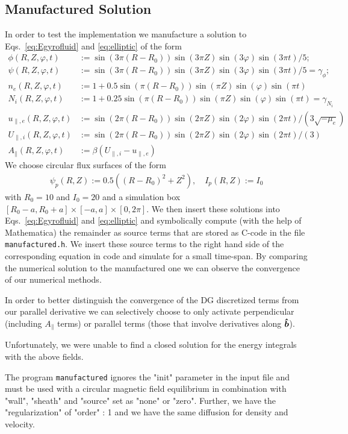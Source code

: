 \subsection{Manufactured Solution} \label{sec:manufactured}
In order to test the implementation we manufacture a solution to
Eqs.~\eqref{eq:Egyrofluid} and \eqref{eq:elliptic} of the form
\begin{align*}
\phi(R,Z,\varphi,t) &:= \sin(3\pi(R-R_0))\sin(3\pi Z)\sin(3\varphi)\sin(3\pi t)/5; \\
\psi(R,Z,\varphi,t) &:= \sin(3\pi(R-R_0))\sin(3\pi Z)\sin(3\varphi)\sin(3\pi t)/5 = \gamma_{\phi}; \\
n_e(R,Z,\varphi, t) &:= 1 + 0.5\sin(\pi(R-R_0))\sin(\pi Z)\sin(\varphi)\sin(\pi t) \\
{N_i}(R,Z,\varphi,t) &:= 1 + 0.25 \sin(\pi(R-R_0))\sin(\pi Z)\sin(\varphi)\sin(\pi t) = \gamma_{N_i} \\
u_{\parallel,e}(R,Z,\varphi, t) &:= \sin(2\pi(R-R_0))\sin(2\pi Z)\sin(2\varphi)\sin(2\pi t)/(3\sqrt{-\mu_e}) \\
U_{\parallel,i}(R,Z,\varphi, t) &:= \sin(2\pi(R-R_0))\sin(2\pi Z)\sin(2\varphi)\sin(2\pi t)/(3) \\
A_\parallel( R,Z,\varphi,t) &:= \beta( U_{\parallel,i} - u_{\parallel,e})
\end{align*}
We choose circular flux surfaces of the form
\begin{align*}
\psi_p(R,Z) :=0.5((R-R_0)^2 + Z^2),\quad
I_p(R,Z):=I_0
\end{align*}
with $R_0=10$ and $I_0=20$ and a simulation box
$[R_0-a,R_0+a]\times[-a,a]\times[0,2\pi]$.
We then insert these solutions into Eqs.~\eqref{eq:Egyrofluid} and
\eqref{eq:elliptic} and symbolically compute (with the help of Mathematica) the
remainder as source terms that are stored as C-code in the file
\texttt{manufactured.h}. We insert these source terms to the right hand
side of the corresponding equation in code and simulate for a small time-span.
By comparing the numerical solution to the manufactured one we can observe the
convergence of our numerical methods.
\begin{tcolorbox}[title=Note]
    In order to better distinguish the convergence of the DG discretized terms
    from our parallel derivative we can selectively choose to only activate
    perpendicular (including $A_\parallel$ terms) or parallel terms (those that
    involve derivatives along $\bm{\hat{b}}$).
\end{tcolorbox}

Unfortunately, we were unable to find a closed solution for the energy integrals with the above fields.
\begin{tcolorbox}[title=Note]
    The program \texttt{manufactured} ignores the "init" parameter
    in the input file and must be used with a circular magnetic field equilibrium
    in combination with "wall", "sheath" and "source" set as "none" or "zero".
    Further, we have the "regularization" of "order" : 1 and we have the same
    diffusion for density and velocity.
\end{tcolorbox}

